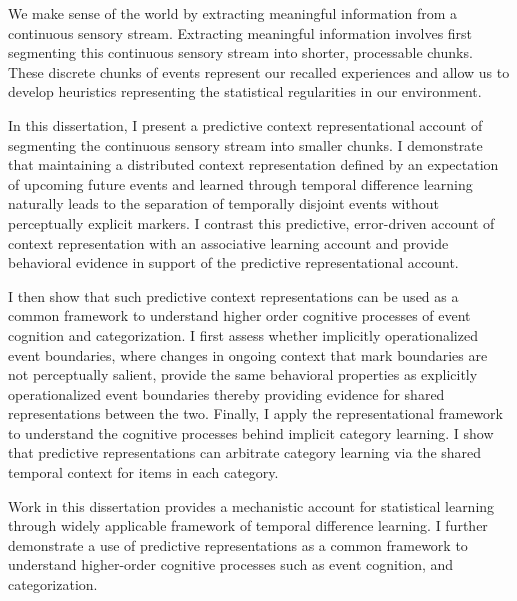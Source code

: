 We make sense of the world by extracting meaningful information from a continuous sensory stream. Extracting meaningful information involves first segmenting this continuous sensory stream into shorter, processable chunks. These discrete chunks of events represent our recalled experiences and allow us to develop heuristics representing the statistical regularities in our environment.

In this dissertation, I present a predictive context representational account of segmenting the continuous sensory stream into smaller chunks. I demonstrate that maintaining a distributed context representation defined by an expectation of upcoming future events and learned through temporal difference learning naturally leads to the separation of temporally disjoint events without perceptually explicit markers. I contrast this predictive, error-driven account of context representation with an associative learning account and provide behavioral evidence in support of the predictive representational account.

I then show that such predictive context representations can be used as a common framework to understand higher order cognitive processes of event cognition and categorization. I first assess whether implicitly operationalized event boundaries, where changes in ongoing context that mark boundaries are not perceptually salient, provide the same behavioral properties as explicitly operationalized event boundaries thereby providing evidence for shared representations between the two. Finally, I apply the representational framework to understand the cognitive processes behind implicit category learning. I show that predictive representations can arbitrate category learning via the shared temporal context for items in each category. 

Work in this dissertation provides a mechanistic account for statistical learning through widely applicable framework of temporal difference learning. I further demonstrate a use of predictive representations as a common framework to understand higher-order cognitive processes such as event cognition, and categorization. 
